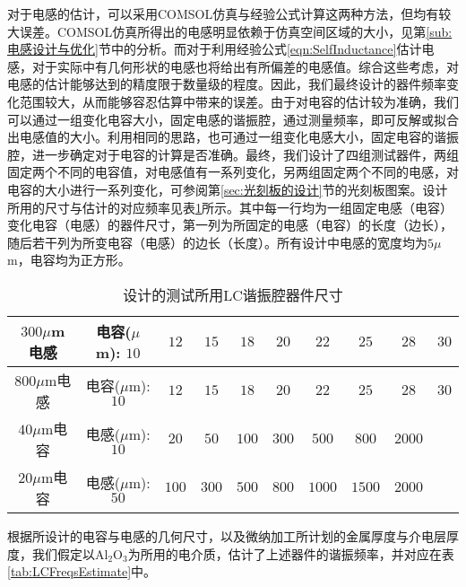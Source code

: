             对于电感的估计，可以采用COMSOL仿真与经验公式计算这两种方法，但均有较大误差。COMSOL仿真所得出的电感明显依赖于仿真空间区域的大小，见第\ref{sub:电感设计与优化}节中的分析。而对于利用经验公式\ref{eqn:SelfInductance}估计电感，对于实际中有几何形状的电感也将给出有所偏差的电感值。综合这些考虑，对电感的估计能够达到的精度限于数量级的程度。因此，我们最终设计的器件频率变化范围较大，从而能够容忍估算中带来的误差。由于对电容的估计较为准确，我们可以通过一组变化电容大小，固定电感的谐振腔，通过测量频率，即可反解或拟合出电感值的大小。利用相同的思路，也可通过一组变化电感大小，固定电容的谐振腔，进一步确定对于电容的计算是否准确。最终，我们设计了四组测试器件，两组固定两个不同的电容值，对电感值有一系列变化，另两组固定两个不同的电感，对电容的大小进行一系列变化，可参阅第\ref{sec:光刻板的设计}节的光刻板图案。设计所用的尺寸与估计的对应频率见表\ref{tab:LCGeometries}所示。其中每一行均为一组固定电感（电容）变化电容（电感）的器件尺寸，第一列为所固定的电感（电容）的长度（边长），随后若干列为所变电容（电感）的边长（长度）。所有设计中电感的宽度均为$5\mu$m，电容均为正方形。



\begin{table}[htb]
  \centering
  \caption{设计的测试所用LC谐振腔器件尺寸}
  \label{tab:LCGeometries}
    \begin{tabular}{c|ccccccccc} %
      \toprule %
      $300 \mu$m电感 & 电容($\mu$m): $10$ & $12$ & $15$ & $18 $ & $20 $ & $22 $ & $25$ & $28 $ & $30 $ \\
      \midrule %
      $800 \mu$m电感 & 电容($\mu$m): $10 $ & $12 $ & $15 $ & $18 $ & $20 $ & $22 $ & $25 $ & $28 $ & $30 $ \\
      \midrule %
      $40\mu$m电容 & 电感($\mu$m): $10$ & $20$ & $50$ & $100$ & $300$ & $500$ & $800$ & $2000$ & \\
      \midrule %
      $20\mu$m电容  & 电感($\mu$m): $50$ & $100$ & $300$ & $500$ & $800$ & $1000$ & $1500$ & $2000$ & \\
      \bottomrule %
    \end{tabular}
\end{table}

            
            根据所设计的电容与电感的几何尺寸，以及微纳加工所计划的金属厚度与介电层厚度，我们假定以Al$_2$O$_3$为所用的电介质，估计了上述器件的谐振频率，并对应在表\ref{tab:LCFreqsEstimate}中。


